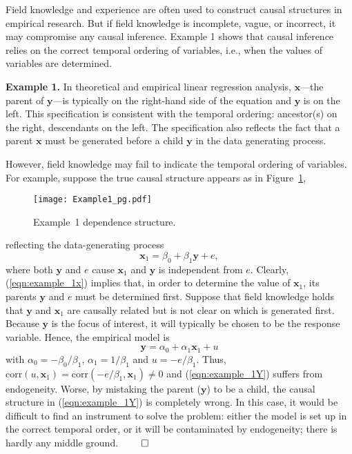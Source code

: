 \documentclass[11pt,review,authoryear]{elsarticle}
\begin{document}
Field knowledge and experience are often used to construct causal structures in empirical research. But if field knowledge is incomplete, vague, or incorrect, it may compromise any causal inference. Example 1 shows that causal inference relies on the correct temporal ordering of variables, i.e., when the values of variables are determined.
\medskip

\noindent
\textbf{Example 1.} In theoretical and empirical linear regression analysis, $\mathbf{x}$---the parent of $\mathbf{y}$---is typically on the right-hand side of the equation and $\mathbf{y}$ is on the left. This specification is consistent with the temporal ordering: ancestor(s) on the right, descendants on the left. The specification also reflects the fact that a parent $\mathbf{x}$ must be generated before a child $\mathbf{y}$ in the data generating process.

However, field knowledge may fail to indicate the temporal ordering of variables. For example, suppose the true causal structure appears as in Figure~\ref{fig:example_1},

\begin{figure}[H]
%
  \centering
  \texttt{[image: Example1\_pg.pdf]}
  \caption{Example~1 dependence structure.}
  \label{fig:example_1}
%
\end{figure}
%
\noindent
reflecting the data-generating process
%
\begin{equation}
    \mathbf{x}_1 = \beta_0 + \beta_1 \mathbf{y} + e,
  \label{eqn:example_1x}
\end{equation}
%
where both $\mathbf{y}$ and $e$ cause $\mathbf{x}_1$ and $\mathbf{y}$ is independent from $e$. Clearly, (\ref{eqn:example_1x}) implies that, in order to determine the value of $\mathbf{x}_1$, its parents $\mathbf{y}$ and $e$ must be determined first. Suppose that field knowledge holds that $\mathbf{y}$ and $\mathbf{x}_1$ are causally related but is not clear on which is generated first. Because $\mathbf{y}$ is the focus of interest, it will typically be chosen to be the response variable. Hence, the empirical model is
%
\begin{equation}
    \mathbf{y} = \alpha_0 +  \alpha_1 \mathbf{x}_1 + u
  \label{eqn:example_1Y}
\end{equation}
%
with $\alpha_0 = - \beta_0/\beta_1$, $\alpha_1 = 1/\beta_1$ and $u = - e/\beta_1$. Thus, $\mathrm{corr} \left( u, \mathbf{x}_1 \right) = \mathrm{corr} \left( - e/\beta_1, \mathbf{x}_1 \right) \neq 0$ and (\ref{eqn:example_1Y}) suffers from endogeneity. Worse, by mistaking the parent ($\mathbf{y}$) to be a child, the causal structure in (\ref{eqn:example_1Y}) is completely wrong. In this case, it would be difficult to find an instrument to solve the problem: either the model is set up in the correct temporal order, or it will be contaminated by endogeneity; there is hardly any middle ground. $\qed$
\medskip
\end{document}
